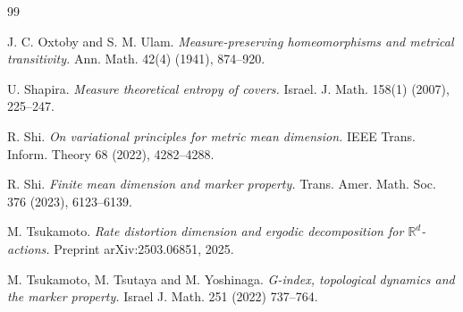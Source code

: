 \documentclass[11pt,a4paper,reqno]{amsart}
\theoremstyle{plain}
\theoremstyle{definition}
\begin{document}
\begin{thebibliography}{99}


J. C. Oxtoby and S. M. Ulam.
\newblock \emph{Measure-preserving homeomorphisms and metrical transitivity.}
\newblock Ann. Math. 42(4) (1941), 874--920.



U. Shapira.
\newblock \emph{Measure theoretical entropy of covers.}
\newblock Israel. J. Math. 158(1) (2007), 225--247.

R. Shi.
\newblock \emph{On variational principles for metric mean dimension.}
\newblock IEEE Trans. Inform. Theory 68 (2022), 4282--4288.

R. Shi.
\newblock \emph{Finite mean dimension and marker property.}
\newblock Trans. Amer. Math. Soc. 376 (2023), 6123--6139.






M. Tsukamoto.
\newblock \emph{Rate distortion dimension and ergodic decomposition for $\mathbb{R}^d$-actions.}
\newblock Preprint arXiv:2503.06851, 2025. 

M. Tsukamoto, M. Tsutaya and M. Yoshinaga.
\newblock \emph{G-index, topological dynamics and the marker property.}
\newblock Israel J. Math. 251 (2022) 737--764.


\end{thebibliography}
\end{document}
